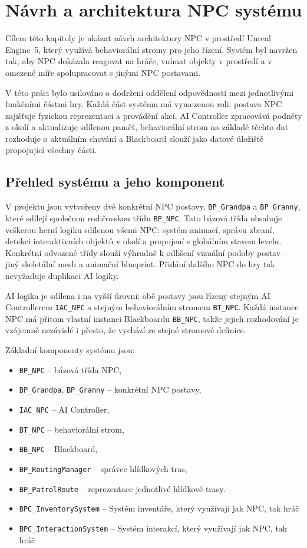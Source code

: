 \chapter{Návrh a architektura NPC systému}

Cílem této kapitoly je ukázat návrh architektury NPC v prostředí Unreal Engine~5, který využívá behaviorální stromy pro jeho řízení. 
Systém byl navržen tak, aby NPC dokázala reagovat na hráče, vnímat objekty v prostředí a v omezené míře spolupracovat s jinými NPC postavami.

V této práci bylo usilováno o dodržení oddělení odpovědností mezi jednotlivými funkčními částmi hry. 
Každá část systému má vymezenou roli: 
postava NPC zajišťuje fyzickou reprezentaci a provádění akcí, AI Controller zpracovává podněty z okolí 
a aktualizuje sdílenou paměť, behaviorální strom na základě těchto dat rozhoduje o aktuálním chování 
a Blackboard slouží jako datové úložiště propojující všechny části.

\section{Přehled systému a jeho komponent}

V projektu jsou vytvořeny dvě konkrétní NPC postavy, \texttt{BP\_Grandpa} a \texttt{BP\_Granny}, které sdílejí společnou rodičovskou třídu \texttt{BP\_NPC}. 
Tato bázová třída obsahuje veškerou herní logiku sdílenou všemi NPC: 
systém animací, správu zbraní, detekci interaktivních objektů v okolí a propojení s globálním stavem levelu. 
Konkrétní odvozené třídy slouží výhradně k odlišení vizuální podoby postav -- jiný skeletální mesh a animační blueprint. 
Přidání dalšího NPC do hry tak nevyžaduje duplikaci AI logiky.

AI logika je sdílena i na vyšší úrovni: obě postavy jsou řízeny stejným AI Controllerem \texttt{IAC\_NPC} a stejným behaviorálním stromem \texttt{BT\_NPC}. Každá instance NPC má přitom vlastní instanci Blackboardu \texttt{BB\_NPC}, takže jejich rozhodování je vzájemně nezávislé i přesto, že vychází ze stejné stromové definice.

Základní komponenty systému jsou:

\begin{itemize}
    \item \texttt{BP\_NPC} -- bázová třída NPC,
    \item \texttt{BP\_Grandpa}, \texttt{BP\_Granny} -- konkrétní NPC postavy,
    \item \texttt{IAC\_NPC} -- AI Controller,
    \item \texttt{BT\_NPC} -- behaviorální strom,
    \item \texttt{BB\_NPC} -- Blackboard,
    \item \texttt{BP\_RoutingManager} -- správce hlídkových tras,
    \item \texttt{BP\_PatrolRoute} -- reprezentace jednotlivé hlídkové trasy.
    \item \texttt{BPC\_InventorySystem} -- Systém inventáře, který využívají jak NPC, tak hráč
    \item \texttt{BPC\_InteractionSystem} -- Systém interakcí, který využívají jak NPC, tak hráč
\end{itemize}

